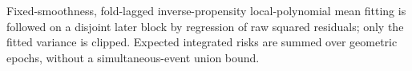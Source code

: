 Fixed-smoothness, fold-lagged inverse-propensity local-polynomial mean fitting is followed on a disjoint later block by regression of raw squared residuals; only the fitted variance is clipped.  Expected integrated risks are summed over geometric epochs, without a simultaneous-event union bound.